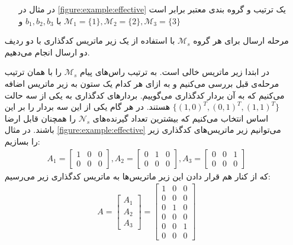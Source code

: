 \begin{itemize}
\begin{enumerate}
			 در مثال در
			 \autoref{figure:example:effective}
			 یک ترتیب و گروه بندی معتبر برابر است با
			 $b_1, b_2, b_3$
			 و
			 $\mathcal{M}_1 = \{1\}, \mathcal{M}_2 = \{2\}, \mathcal{M}_3 = \{3\}$
		\end{enumerate}
	\item[مرحله ارسال] 
	برای هر گروه
	$\mathcal{M}_s$
	با استفاده از یک زیر ماتریس کدگذاری با دو ردیف دو ارسال انجام می‌دهیم.
	
	در ابتدا زیر ماتریس خالی است. به ترتیب راس‌های پیام
	$\mathcal{M}_s$
	را با همان ترتیب مرحله‌ی قبل بررسی می‌کنیم و به ازای هر کدام یک ستون به زیر ماتریس اضافه می‌کنیم که به آن بردار کدگذاری می‌گوییم. بردارهای کدگذاری به یکی از سه حالت
	$\{(1, 0)^T, (0, 1)^T, (1, 1)^T\}$
	هستند. در هر گام یکی از این سه بردار را بر این اساس انتخاب می‌کنیم که بیشترین تعداد گیرنده‌های
	$\mathcal{N}_s$
	را همچنان قابل ارضا باشند. در مثال
	\autoref{figure:example:effective}
	می‌توانیم زیر ماتریس‌های کدگذاری زیر را بسازیم:
	\begin{align*}
		A_1 = \begin{bmatrix}
			1 & 0 & 0 \\
			0 & 0 & 0
		\end{bmatrix}, 
		A_2 =   \begin{bmatrix}
			0 & 1 & 0 \\
			0 & 0 & 0
		\end{bmatrix},
		A_3 =   \begin{bmatrix}
			0 & 0 & 1 \\
			0 & 0 & 0
		\end{bmatrix}
	\end{align*}
	که از کنار هم قرار دادن این زیر ماتریس‌ها به ماتریس کدگذاری زیر می‌رسیم:
		\begin{align*}
		A =  \begin{bmatrix}
			A_1\\
			A_2\\
			A_3
				\end{bmatrix}
			= \begin{bmatrix}
			1 & 0 & 0 \\
			0 & 0 & 0 \\
			0 & 1 & 0 \\
			0 & 0 & 0 \\
			0 & 0 & 1 \\
			0 & 0 & 0
		\end{bmatrix}
			\end{align*}
\end{itemize}
